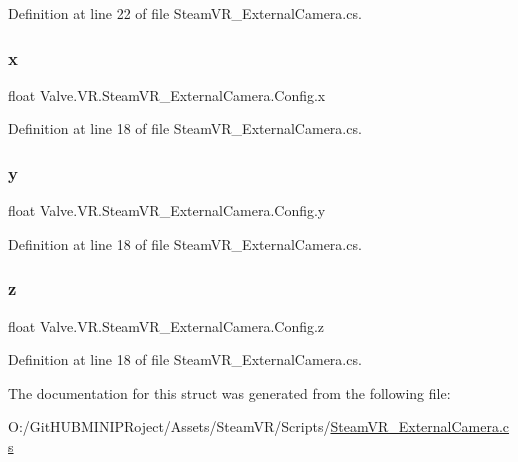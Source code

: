 Definition at line 22 of file Steam\+V\+R\+\_\+\+External\+Camera.\+cs.

\mbox{\label{struct_valve_1_1_v_r_1_1_steam_v_r___external_camera_1_1_config_a6259b88cd56a3e47f6167f0980314959}} 
\subsubsection{\texorpdfstring{x}{x}}
{\footnotesize\ttfamily float Valve.\+V\+R.\+Steam\+V\+R\+\_\+\+External\+Camera.\+Config.\+x}



Definition at line 18 of file Steam\+V\+R\+\_\+\+External\+Camera.\+cs.

\mbox{\label{struct_valve_1_1_v_r_1_1_steam_v_r___external_camera_1_1_config_a63e4f35905e824136faf2a28c83723bb}} 
\subsubsection{\texorpdfstring{y}{y}}
{\footnotesize\ttfamily float Valve.\+V\+R.\+Steam\+V\+R\+\_\+\+External\+Camera.\+Config.\+y}



Definition at line 18 of file Steam\+V\+R\+\_\+\+External\+Camera.\+cs.

\mbox{\label{struct_valve_1_1_v_r_1_1_steam_v_r___external_camera_1_1_config_af38470d47453046c727eba474ad594ea}} 
\subsubsection{\texorpdfstring{z}{z}}
{\footnotesize\ttfamily float Valve.\+V\+R.\+Steam\+V\+R\+\_\+\+External\+Camera.\+Config.\+z}



Definition at line 18 of file Steam\+V\+R\+\_\+\+External\+Camera.\+cs.



The documentation for this struct was generated from the following file\+:\begin{DoxyCompactItemize}
\item 
O\+:/\+Git\+H\+U\+B\+M\+I\+N\+I\+P\+Roject/\+Assets/\+Steam\+V\+R/\+Scripts/\mbox{\hyperlink{_steam_v_r___external_camera_8cs}{Steam\+V\+R\+\_\+\+External\+Camera.\+cs}}\end{DoxyCompactItemize}
